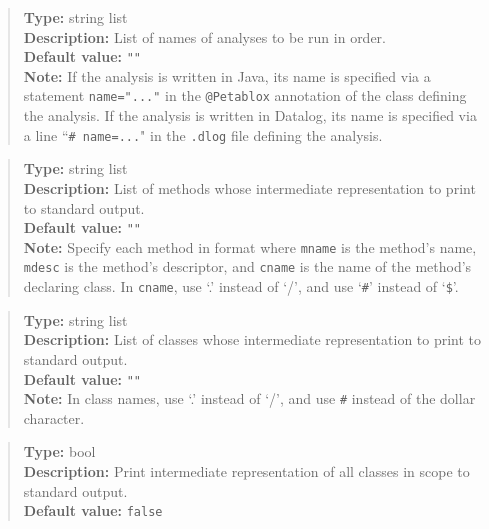 \begin{quote}
{\bf Type:} string list  \\
{\bf Description:} List of names of analyses to be run in order. \\
{\bf Default value:} {\tt ""} \\
{\bf Note:} If the analysis is written in Java, its name is specified via
a statement {\tt name="..."} in the {\tt @Petablox} annotation of the class defining
the analysis.  If the analysis is written in Datalog, its name is specified via
a line ``{\tt \# name=...}" in the {\tt .dlog} file defining the analysis.
\end{quote}

\begin{quote}
{\bf Type:} string list  \\
{\bf Description:} List of methods whose intermediate representation to print to standard output. \\
{\bf Default value:} {\tt ""} \\
{\bf Note:} Specify each method in format  where {\tt mname} is the method's name, {\tt mdesc} is the method's descriptor, and {\tt cname} is the name of the method's declaring class. In {\tt cname}, use `.' instead of `/', and use `{\tt \#}' instead of `{\tt \$}'. 
\end{quote}

\begin{quote}
{\bf Type:} string list  \\
{\bf Description:} List of classes whose intermediate representation to print to standard output. \\
{\bf Default value:} {\tt ""} \\
{\bf Note:} In class names, use `.' instead of `/', and use {\tt \#} instead of the dollar character. 
\end{quote}

\begin{quote}
{\bf Type:} bool \\
{\bf Description:} Print intermediate representation of all classes in scope to standard output. \\
{\bf Default value:} {\tt false}
\end{quote}

